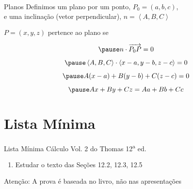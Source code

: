 \documentclass[fleqn,utf8,aspectratio=169,12pt]{beamer}
\begin{document}
\begin{frame}{Planos}
  Definimos um plano por um ponto, $P_0=(a, b, c)$, \\
  \pause
  e uma inclinação (vetor perpendicular), $n=\left<A, B, C\right>$

  \pause
  \vspace{\baselineskip}
  $P=(x, y, z)$ pertence ao plano se

  \[
    \pause
    n\cdot \overrightarrow{P_0P} = 0
  \]
  \[
    \pause
    \left<A, B, C\right>\cdot \left<x-a, y-b, z-c\right> = 0
  \]
  \[
    \pause
    A(x-a) + B(y-b) + C(z-c) = 0
  \]
  \[
    \pause
    Ax + By + Cz = Aa + Bb + Cc
  \]
\end{frame}

\section{Lista Mínima}

\begin{frame}{Lista Mínima}
  Cálculo Vol. 2 do Thomas 12\textsuperscript{a} ed.
  \begin{enumerate}
    \item Estudar o texto das Seções 12.2, 12.3, 12.5
  \end{enumerate}

  \vfill
  Atenção: A prova é baseada no livro, não nas apresentações
\end{frame}

\end{document}
